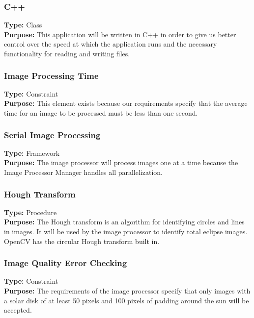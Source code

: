 \documentclass[10pt, onecolumn, draftclsnofoot, letterpaper, compsoc]{IEEEtran}
\begin{document}
\subsubsection{C++}
\textbf{Type:} Class\\
\textbf{Purpose:} This application will be written in C++ in order to give us
better control over the speed at which the application runs and the necessary
functionality for reading and writing files. \\

\subsubsection{Image Processing Time}
\textbf{Type:} Constraint\\
\textbf{Purpose:} This element exists because our requirements specify that the
average time for an image to be processed must be less than one second.\\

\subsubsection{Serial Image Processing}
\textbf{Type:} Framework\\
\textbf{Purpose:} The image processor will process images one at a time because
the Image Processor Manager handles all parallelization.\\

\subsubsection{Hough Transform}
\textbf{Type:} Procedure\\
\textbf{Purpose:} The Hough transform is an algorithm for identifying circles
and lines in images. It will be used by the image processor to identify total
eclipse images. OpenCV has the circular Hough transform built in. \\

\subsubsection{Image Quality Error Checking}
\textbf{Type:} Constraint\\
\textbf{Purpose:} The requirements of the image processor specify that only
images with a solar disk of at least 50 pixels and 100 pixels of padding around
the sun will be accepted.\\
\end{document}
